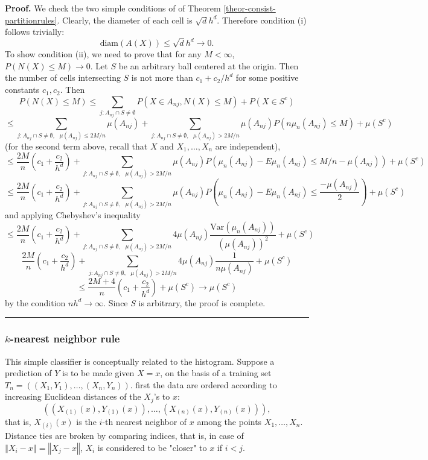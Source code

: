 \documentclass[11pt,twoside]{article}%
\theoremstyle{change}
\newenvironment{proof}[1][Proof]{\textbf{#1.} }{\ \rule{0.5em}{0.5em}}
\begin{document}
\begin{proof}
We check the two simple conditions of of Theorem
\ref{theor-consist-partitionrules}. Clearly, the diameter of each cell is
$\sqrt{d}h^{d}$. Therefore condition (i) follows trivially:
\[
\mathrm{diam}(A(X))\leq\sqrt{d}h^{d}\rightarrow0.
\]
To show condition (ii), we need to prove that for any $M<\infty$, $P\left(
N(X)\leq M\right)  \rightarrow0$. Let $S$ be an arbitrary ball centered at the
origin. Then the number of cells intersecting $S$ is not more than
$c_{1}+c_{2}/h^{d}$ for some positive constants $c_{1},c_{2}$. Then
\[
P\left(  N(X)\leq M\right)  \leq\sum_{j:A_{nj}\cap S\neq\emptyset}P\left(
X\in A_{nj},N(X)\leq M\right)  +P\left(  X\in S^{c}\right)
\]%
\[
\leq\sum_{j:A_{nj}\cap S\neq\emptyset,\text{ }\mu(A_{nj})\leq2M/n}\mu\left(
A_{nj}\right)  +\sum_{j:A_{nj}\cap S\neq\emptyset,\text{ }\mu(A_{nj})>2M/n}%
\mu\left(  A_{nj}\right)  P\left(  n\mu_{n}(A_{nj})\leq M\right)  +\mu(S^{c})
\]
(for the second term above, recall that $X$ and $X_{1},\ldots,X_{n}$ are
independent),%
\[
\leq\frac{2M}{n}\left(  c_{1}+\frac{c_{2}}{h^{d}}\right)  +\sum_{j:A_{nj}\cap
S\neq\emptyset,\text{ }\mu(A_{nj})>2M/n}\mu\left(  A_{nj}\right)  P\left(
\mu_{n}(A_{nj})-E\mu_{n}(A_{nj})\leq M/n-\mu(A_{nj})\right)  +\mu(S^{c})
\]%
\[
\leq\frac{2M}{n}\left(  c_{1}+\frac{c_{2}}{h^{d}}\right)  +\sum_{j:A_{nj}\cap
S\neq\emptyset,\text{ }\mu(A_{nj})>2M/n}\mu\left(  A_{nj}\right)  P\left(
\mu_{n}(A_{nj})-E\mu_{n}(A_{nj})\leq\frac{-\mu(A_{nj})}{2}\right)  +\mu(S^{c})
\]
and applying Chebyshev's inequality%
\[
\leq\frac{2M}{n}\left(  c_{1}+\frac{c_{2}}{h^{d}}\right)  +\sum_{j:A_{nj}\cap
S\neq\emptyset,\text{ }\mu(A_{nj})>2M/n}4\mu\left(  A_{nj}\right)
\frac{\mathrm{Var}\left(  \mu_{n}(A_{nj})\right)  }{\left(  \mu(A_{nj}%
)\right)  ^{2}}+\mu(S^{c})
\]%
\[
\frac{2M}{n}\left(  c_{1}+\frac{c_{2}}{h^{d}}\right)  +\sum_{j:A_{nj}\cap
S\neq\emptyset,\text{ }\mu(A_{nj})>2M/n}4\mu\left(  A_{nj}\right)  \frac
{1}{n\mu(A_{nj})}+\mu(S^{c})
\]%
\[
\leq\frac{2M+4}{n}\left(  c_{1}+\frac{c_{2}}{h^{d}}\right)  +\mu
(S^{c})\rightarrow\mu(S^{c})
\]
by the condition $nh^{d}\rightarrow\infty$. Since $S$ is arbitrary, the proof
is complete.
\end{proof}

\subsubsection{$k$-nearest neighbor rule}

This simple classifier is conceptually related to the histogram. Suppose a
prediction of $Y$ is to be made given $X=x$, on the basis of a training set
$T_{n}=\left(  (X_{1},Y_{1}),\ldots,(X_{n},Y_{n})\right)  $. first the data
are ordered according to increasing Euclidean distances of the $X_{j}$'s to
$x$:
\[
\left(  (X_{\left(  1\right)  }(x),Y_{(1)}(x)),\ldots,(X_{(n)}(x),Y_{(n)}%
(x))\right)  ,
\]
that is, $X_{\left(  i\right)  }(x)$ is the $i$-th nearest neighbor of $x$
among the points $X_{1},\ldots,X_{n}$. Distance ties are broken by comparing
indices, that is, in case of $\left\Vert X_{i}-x\right\Vert =\left\Vert
X_{j}-x\right\Vert $, $X_{i}$ is considered to be "closer" to $x$ if $i<j$.
\end{document}
